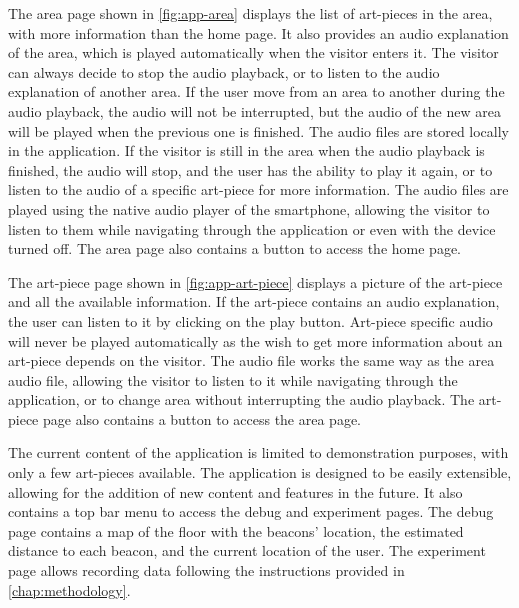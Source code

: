 The area page shown in \autoref{fig:app-area} displays the list of art-pieces in the area, with more information than the home page. It also provides an audio explanation of the area, which is played automatically when the visitor enters it. The visitor can always decide to stop the audio playback, or to listen to the audio explanation of another area. If the user move from an area to another during the audio playback, the audio will not be interrupted, but the audio of the new area will be played when the previous one is finished. The audio files are stored locally in the application. If the visitor is still in the area when the audio playback is finished, the audio will stop, and the user has the ability to play it again, or to listen to the audio of a specific art-piece for more information. The audio files are played using the native audio player of the smartphone, allowing the visitor to listen to them while navigating through the application or even with the device turned off. The area page also contains a button to access the home page.

The art-piece page shown in \autoref{fig:app-art-piece} displays a picture of the art-piece and all the available information. If the art-piece contains an audio explanation, the user can listen to it by clicking on the play button. Art-piece specific audio will never be played automatically as the wish to get more information about an art-piece depends on the visitor. The audio file works the same way as the area audio file, allowing the visitor to listen to it while navigating through the application, or to change area without interrupting the audio playback. The art-piece page also contains a button to access the area page.

The current content of the application is limited to demonstration purposes, with only a few art-pieces available. The application is designed to be easily extensible, allowing for the addition of new content and features in the future. It also contains a top bar menu to access the debug and experiment pages. The debug page contains a map of the floor with the beacons' location, the estimated distance to each beacon, and the current location of the user. The experiment page allows recording data following the instructions provided in \autoref{chap:methodology}.

